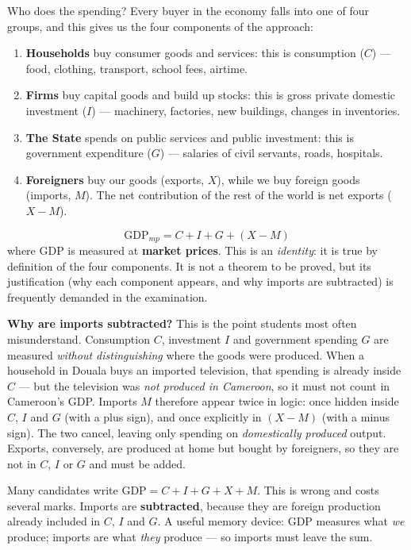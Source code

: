 \documentclass[11pt]{article}
\newcommand{\cle}[1]{{\popxbold\color{popdark}#1}}
\newcounter{popsec}
\newcounter{popsub}
\newcommand{\courssub}[1]{%
  \stepcounter{popsub}%
  \par\vspace{9pt}\noindent{\popxbold\fontsize{11.5}{13}\selectfont\color{popink}{\color{poporange}\thepopsec.\thepopsub}\hspace{6pt}#1}\par\nopagebreak\vspace{4pt}
}
\begin{document}
Who does the spending? Every buyer in the economy falls into one of four groups, and this gives us the four components of the approach:

\begin{enumerate}
\item \textbf{Households} buy consumer goods and services: this is \cle{consumption} ($C$) — food, clothing, transport, school fees, airtime.
\item \textbf{Firms} buy capital goods and build up stocks: this is \cle{gross private domestic investment} ($I$) — machinery, factories, new buildings, changes in inventories.
\item \textbf{The State} spends on public services and public investment: this is \cle{government expenditure} ($G$) — salaries of civil servants, roads, hospitals.
\item \textbf{Foreigners} buy our goods (exports, $X$), while we buy foreign goods (imports, $M$). The net contribution of the rest of the world is \cle{net exports} ($X - M$).
\end{enumerate}

\courssub{The fundamental identity}

\begin{propriete}
\[
\text{GDP}_{mp} = C + I + G + (X - M)
\]
where GDP is measured at \textbf{market prices}. This is an \emph{identity}: it is true by definition of the four components. It is not a theorem to be proved, but its justification (why each component appears, and why imports are subtracted) is frequently demanded in the examination.
\end{propriete}

\textbf{Why are imports subtracted?} This is the point students most often misunderstand. Consumption $C$, investment $I$ and government spending $G$ are measured \emph{without distinguishing} where the goods were produced. When a household in Douala buys an imported television, that spending is already inside $C$ — but the television was \emph{not produced in Cameroon}, so it must not count in Cameroon's GDP. Imports $M$ therefore appear twice in logic: once hidden inside $C$, $I$ and $G$ (with a plus sign), and once explicitly in $(X - M)$ (with a minus sign). The two cancel, leaving only spending on \emph{domestically produced} output. Exports, conversely, are produced at home but bought by foreigners, so they are not in $C$, $I$ or $G$ and must be added.

\begin{attention}
Many candidates write $\text{GDP} = C + I + G + X + M$. This is wrong and costs several marks. Imports are \textbf{subtracted}, because they are foreign production already included in $C$, $I$ and $G$. A useful memory device: GDP measures what \emph{we} produce; imports are what \emph{they} produce — so imports must leave the sum.
\end{attention}
\end{document}
